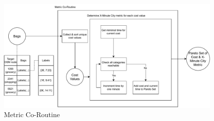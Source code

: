 \begin{figure}
    \centering
    \includegraphics[scale=0.60]{Figures/method/metric_coroutine}
    \caption{Metric Co-Routine}
    \label{fig:metric_co_routine}
\end{figure}
